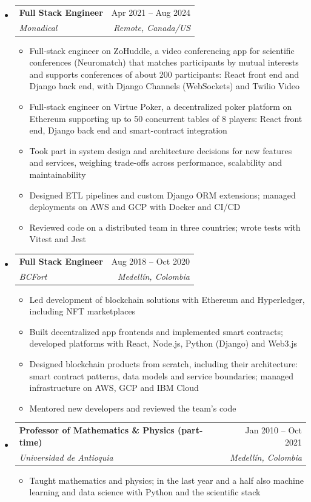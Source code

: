 \documentclass[letterpaper,10pt]{article}
\makeatletter
\newcommand{\resumeSubheading}[4]{
  \vspace{-2pt}
  \item[]
  \begin{tabular*}{\textwidth}{@{\extracolsep{\fill}}l r}
    \textbf{#1} & #2 \\
    \textit{#3} & \textit{#4} \\
  \end{tabular*}
  \vspace{-5pt}
}
\makeatother
\begin{document}
\begin{itemize}[leftmargin=0pt, itemindent=0pt, label={}, itemsep=1pt]
\begin{itemize}[leftmargin=*, itemsep=0pt]
    \item Ran technical design sessions with clients, translating business requirements into system architectures
\end{itemize}
\resumeSubheading
{Full Stack Engineer}{Apr 2021 -- Aug 2024}
{Monadical}{Remote, Canada/US}
\begin{itemize}[leftmargin=*, itemsep=0pt]
    \item Full-stack engineer on ZoHuddle, a video conferencing app for scientific conferences (Neuromatch) that matches participants by mutual interests and supports conferences of about 200 participants: React front end and Django back end, with Django Channels (WebSockets) and Twilio Video
    \item Full-stack engineer on Virtue Poker, a decentralized poker platform on Ethereum supporting up to 50 concurrent tables of 8 players: React front end, Django back end and smart-contract integration
    \item Took part in system design and architecture decisions for new features and services, weighing trade-offs across performance, scalability and maintainability
    \item Designed ETL pipelines and custom Django ORM extensions; managed deployments on AWS and GCP with Docker and CI/CD
    \item Reviewed code on a distributed team in three countries; wrote tests with Vitest and Jest
\end{itemize}
\resumeSubheading
{Full Stack Engineer}{Aug 2018 -- Oct 2020}
{BCFort}{Medell\'in, Colombia}
\begin{itemize}[leftmargin=*, itemsep=0pt]
    \item Led development of blockchain solutions with Ethereum and Hyperledger, including NFT marketplaces
    \item Built decentralized app frontends and implemented smart contracts; developed platforms with React, Node.js, Python (Django) and Web3.js
    \item Designed blockchain products from scratch, including their architecture: smart contract patterns, data models and service boundaries; managed infrastructure on AWS, GCP and IBM Cloud
    \item Mentored new developers and reviewed the team's code
\end{itemize}
\resumeSubheading
{Professor of Mathematics \& Physics (part-time)}{Jan 2010 -- Oct 2021}
{Universidad de Antioquia}{Medell\'in, Colombia}
\begin{itemize}[leftmargin=*, itemsep=0pt]
    \item Taught mathematics and physics; in the last year and a half also machine learning and data science with Python and the scientific stack
\end{itemize}
\end{itemize}
\end{document}
